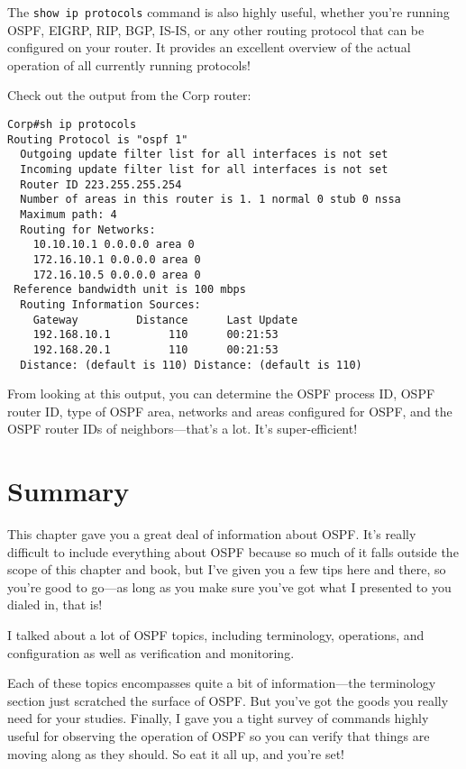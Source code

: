 The \texttt{show\ ip\ protocols} command is also highly useful, whether
you're running OSPF, EIGRP, RIP, BGP, IS-IS, or any other routing
protocol that can be configured on your router. It provides an excellent
overview of the actual operation of all currently running protocols!

Check out the output from the Corp router:

\begin{verbatim}
Corp#sh ip protocols
Routing Protocol is "ospf 1"
  Outgoing update filter list for all interfaces is not set
  Incoming update filter list for all interfaces is not set
  Router ID 223.255.255.254
  Number of areas in this router is 1. 1 normal 0 stub 0 nssa
  Maximum path: 4
  Routing for Networks:
    10.10.10.1 0.0.0.0 area 0
    172.16.10.1 0.0.0.0 area 0
    172.16.10.5 0.0.0.0 area 0
 Reference bandwidth unit is 100 mbps
  Routing Information Sources:
    Gateway         Distance      Last Update
    192.168.10.1         110      00:21:53
    192.168.20.1         110      00:21:53
  Distance: (default is 110) Distance: (default is 110)
\end{verbatim}

From looking at this output, you can determine the OSPF process ID, OSPF
router ID, type of OSPF area, networks and areas configured for OSPF,
and the OSPF router IDs of neighbors---that's a lot. It's
super-efficient!



\section{Summary}

This chapter gave you a great deal of information about OSPF. It's
really difficult to include everything about OSPF because so much of it
falls outside the scope of this chapter and book, but I've given you a
few tips here and there, so you're good to go---as long as you make sure
you've got what I presented to you dialed in, that is!

I talked about a lot of OSPF topics, including terminology, operations,
and configuration as well as verification and monitoring.

Each of these topics encompasses quite a bit of information---the
terminology section just scratched the surface of OSPF. But you've got
the goods you really need for your studies. Finally, I gave you a tight
survey of commands highly useful for observing the operation of OSPF so
you can verify that things are moving along as they should. So eat it
all up, and you're set!



